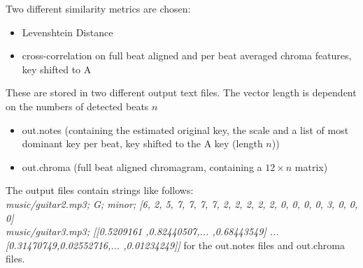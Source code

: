 Two different similarity metrics are chosen: 
\begin{itemize}
	\item Levenshtein Distance
	\item cross-correlation on full beat aligned and per beat averaged chroma features, key shifted to A
\end{itemize}
These are stored in two different output text files. The vector length is dependent on the numbers of detected beats $n$
\begin{itemize}
	\item out.notes (containing the estimated original key, the scale and a list of most dominant key per beat, key shifted to the A key (length $n$))
	\item out.chroma (full beat aligned chromagram, containing a $12 \times n$ matrix)
\end{itemize}
The output files contain strings like follows:\\
\textit{music/guitar2.mp3; G; minor; [6, 2, 5, 7, 7, 7, 7, 2, 2, 2, 2, 2, 0, 0, 0, 0, 3, 0, 0, 0]}\\
\textit{music/guitar3.mp3; [[0.5209161 ,0.82440507,... ,0.68443549] ... [0.31470749,0.02552716,... ,0.01234249]]}
for the out.notes files and out.chroma files. 
